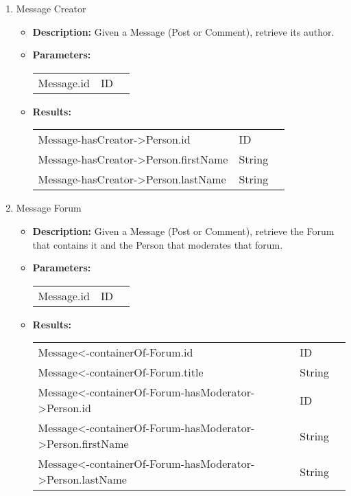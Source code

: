 \begin{enumerate}
  \item Message Creator 
    \begin{itemize}
      \item \textbf{Description:}
        Given a Message (Post or Comment), retrieve its author.
      \item \textbf{Parameters:} \\
        \begin{tabular}{lll}
          Message.id 										& ID \\
        \end{tabular}
      \item \textbf{Results:} \\
        \begin{tabular}{lll}
          Message-hasCreator->Person.id     									& ID \\
          Message-hasCreator->Person.firstName     									& String \\
          Message-hasCreator->Person.lastName    									& String \\
        \end{tabular}
    \end{itemize}

  \item Message Forum 
    \begin{itemize}
      \item \textbf{Description:}
        Given a Message (Post or Comment), retrieve the Forum that contains it and the Person that moderates that forum.
      \item \textbf{Parameters:} \\
        \begin{tabular}{lll}
          Message.id 										& ID \\
        \end{tabular}
      \item \textbf{Results:} \\
        \begin{tabular}{lll}
          Message<-containerOf-Forum.id                       & ID \\
          Message<-containerOf-Forum.title     									& String \\
          Message<-containerOf-Forum-hasModerator->Person.id     									& ID \\
          Message<-containerOf-Forum-hasModerator->Person.firstName    									& String \\
          Message<-containerOf-Forum-hasModerator->Person.lastName    									& String \\
        \end{tabular}
    \end{itemize}


\end{enumerate}
